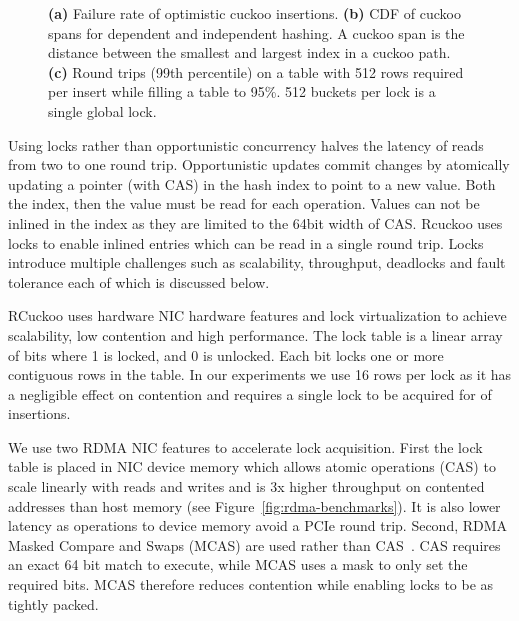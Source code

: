 \begin{figure}[t]
\begin{subfigure}{0.3\linewidth}
    \end{subfigure}
    \vspace{-1em}
    \caption{
    \textbf{(a)} Failure rate of optimistic cuckoo insertions.
    \textbf{(b)} CDF of cuckoo spans for dependent and independent hashing. A cuckoo span is the distance between the smallest and largest index in a cuckoo path.
    \textbf{(c)} Round trips (99th percentile) on a table
    with 512 rows required per insert while filling a table
    to 95\%. 512 buckets per lock is a single global lock.}

    \label{fig:cuckoo-problems}

\end{figure}

Using locks rather than opportunistic concurrency halves the
latency of reads from two to one round trip. Opportunistic
updates commit changes by atomically updating a pointer
(with CAS) in the hash index to point to a new value. Both
the index, then the value must be read for each operation.
Values can not be inlined in the index as they are limited
to the 64bit width of CAS. Rcuckoo uses locks to enable
inlined entries which can be read in a single round trip.
Locks introduce multiple challenges such as scalability,
throughput, deadlocks and fault tolerance each of which is
discussed below.

RCuckoo uses hardware NIC hardware features and lock
virtualization to achieve scalability, low contention and
high performance. The lock table is a linear array of bits
where 1 is locked, and 0 is unlocked. Each bit locks one or
more contiguous rows in the table. In our experiments we use
16 rows per lock as it has a negligible effect on contention
and requires a single lock to be acquired for  of insertions.

We use two RDMA NIC features to accelerate lock
acquisition. First the lock table is placed in NIC device
memory which allows atomic operations (CAS) to
scale linearly with reads and writes and is 3x higher
throughput on contented addresses than host memory (see
Figure~\ref{fig:rdma-benchmarks}). It is also lower latency
as operations to device memory avoid a PCIe round trip.
Second, RDMA Masked Compare and Swaps (MCAS) are used rather
than CAS~\cite{rdma-masked-cas,sherman}. CAS requires an
exact 64 bit match to execute, while MCAS uses a mask to
only set the required bits. MCAS therefore reduces
contention while enabling locks to be as tightly packed.

